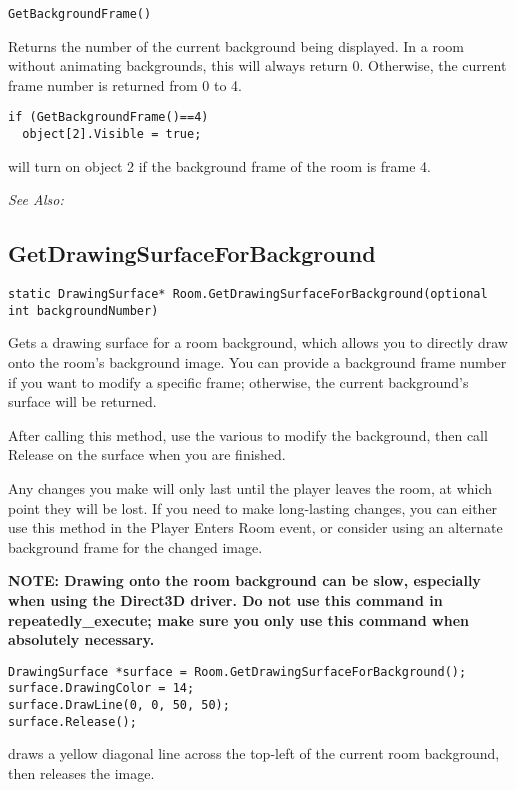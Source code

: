 \begin{verbatim}
GetBackgroundFrame()
\end{verbatim}
Returns the number of the current background being displayed. In a room
without animating backgrounds, this will always return 0. Otherwise, the
current frame number is returned from 0 to 4.

\begin{verbatim}
if (GetBackgroundFrame()==4)
  object[2].Visible = true;
\end{verbatim}
will turn on object 2 if the background frame of the room is frame 4.

\it{See Also:} 


\subsection{GetDrawingSurfaceForBackground}\label{Room.GetDrawingSurfaceForBackground}%

\begin{verbatim}
static DrawingSurface* Room.GetDrawingSurfaceForBackground(optional int backgroundNumber)
\end{verbatim}
Gets a drawing surface for a room background, which allows you to directly draw
onto the room's background image. You can provide a background frame number if you
want to modify a specific frame; otherwise, the current background's surface will be returned.

After calling this method, use the various  to modify the
background, then call Release on the surface when you are finished.

Any changes you make will only last until the player leaves the room, at
which point they will be lost. If you need to make long-lasting changes, you
can either use this method in the Player Enters Room event, or consider using
an alternate background frame for the changed image.

\bf{NOTE:} Drawing onto the room background can be slow, especially when using the Direct3D
driver. Do not use this command in repeatedly_execute; make sure you only use this command
when absolutely necessary.

\begin{verbatim}
DrawingSurface *surface = Room.GetDrawingSurfaceForBackground();
surface.DrawingColor = 14;
surface.DrawLine(0, 0, 50, 50);
surface.Release();
\end{verbatim}
draws a yellow diagonal line across the top-left of the current room background,
then releases the image.

